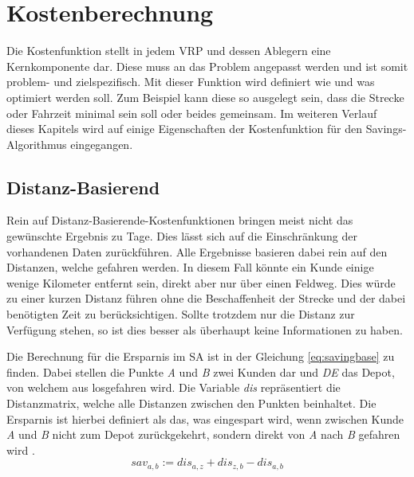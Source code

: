 \chapter{Kostenberechnung}
\label{Kostenberechnung}

Die Kostenfunktion stellt in jedem VRP und dessen Ablegern eine Kernkomponente dar. 
Diese muss an das Problem angepasst werden und ist somit problem- und zielspezifisch. 
Mit dieser Funktion wird definiert wie und was optimiert werden soll. 
Zum Beispiel kann diese so ausgelegt sein, dass die Strecke oder Fahrzeit minimal sein soll oder beides gemeinsam. 
Im weiteren Verlauf dieses Kapitels wird auf einige Eigenschaften der Kostenfunktion für den Savings-Algorithmus eingegangen.  

\section{Distanz-Basierend}

Rein auf Distanz-Basierende-Kostenfunktionen bringen meist nicht das gewünschte Ergebnis zu Tage. 
Dies lässt sich auf die Einschränkung der vorhandenen Daten zurückführen. 
Alle Ergebnisse basieren dabei rein auf den Distanzen, welche gefahren werden. 
In diesem Fall könnte ein Kunde einige wenige Kilometer entfernt sein, direkt aber nur über einen Feldweg. 
Dies würde zu einer kurzen Distanz führen ohne die Beschaffenheit der Strecke und der dabei benötigten Zeit zu berücksichtigen. 
Sollte trotzdem nur die Distanz zur Verfügung stehen, so ist dies besser als überhaupt keine Informationen zu haben. 

\noindent
Die Berechnung für die Ersparnis im SA ist in der Gleichung \ref{eq:savingbase} zu finden. 
Dabei stellen die Punkte \textit{A} und \textit{B} zwei Kunden dar und \textit{DE} das Depot, von welchem aus losgefahren wird. 
Die Variable \textit{dis} repräsentiert die Distanzmatrix, welche alle Distanzen zwischen den Punkten beinhaltet. 
Die Ersparnis ist hierbei definiert als das, was eingespart wird, wenn zwischen Kunde \textit{A} und \textit{B} nicht zum Depot zurückgekehrt, sondern direkt von \textit{A} nach \textit{B} gefahren wird \cite{clarke1964scheduling}. 
\begin{equation}
sav_{a,b} := dis_{a,z} + dis_{z,b} - dis_{a,b}
\label{eq:savingbase}
\end{equation}

